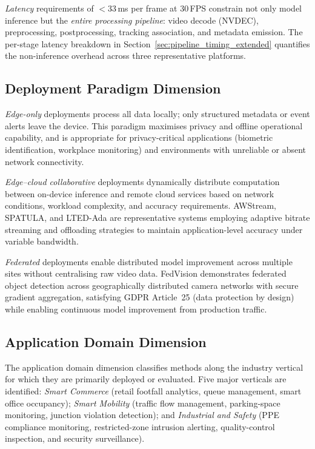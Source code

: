\documentclass[11pt,a4paper]{article}
\begin{document}
\textit{Latency} requirements of $<$33\,ms per frame at 30\,FPS
constrain not only model inference but the \emph{entire processing
pipeline}: video decode (NVDEC), preprocessing, postprocessing,
tracking association, and metadata emission. The per-stage latency
breakdown in Section~\ref{sec:pipeline_timing_extended} quantifies
the non-inference overhead across three representative platforms.

\subsection{Deployment Paradigm Dimension}
\label{subsec:tax_deployment}

\textit{Edge-only} deployments process all data locally; only
structured metadata or event alerts leave the device. This paradigm
maximises privacy and offline operational capability, and is
appropriate for privacy-critical applications (biometric
identification, workplace monitoring) and environments with
unreliable or absent network connectivity.

\textit{Edge--cloud collaborative} deployments dynamically distribute
computation between on-device inference and remote cloud services
based on network conditions, workload complexity, and accuracy
requirements. AWStream, SPATULA, and LTED-Ada are representative
systems employing adaptive bitrate streaming and offloading strategies
to maintain application-level accuracy under variable bandwidth.

\textit{Federated} deployments enable distributed model improvement
across multiple sites without centralising raw video data.
FedVision demonstrates federated object detection across
geographically distributed camera networks with secure gradient
aggregation, satisfying GDPR Article~25 (data protection by design)
while enabling continuous model improvement from production traffic.

\subsection{Application Domain Dimension}
\label{subsec:tax_domain}

The application domain dimension classifies methods along the industry
vertical for which they are primarily deployed or evaluated. Five major
verticals are identified: \textit{Smart Commerce} (retail footfall
analytics, queue management, smart office occupancy); \textit{Smart
Mobility} (traffic flow management, parking-space monitoring,
junction violation detection); and \textit{Industrial and Safety}
(PPE compliance monitoring, restricted-zone intrusion alerting,
quality-control inspection, and security surveillance).
\end{document}
